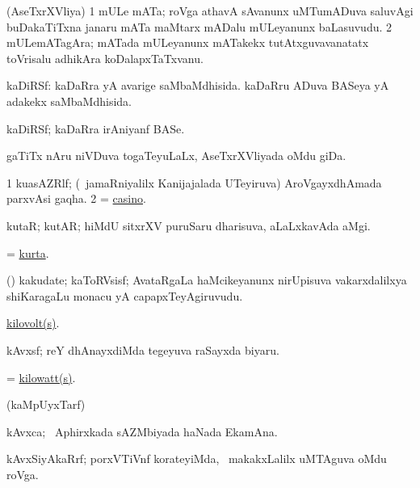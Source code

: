 \bentry
{}
\gl{\nA}
\bmng
(AseTxrXVliya) 
\bnum
\num{1} mULe mATa; roVga athavA sAvanunx uMTumADuva saluvAgi buDakaTiTxna janaru mATa maMtarx mADalu mULeyanunx baLasuvudu. 
\num{2} mULemATagAra; mATada mULeyanunx mATakekx tutAtxguvavanatatx toVrisalu adhikAra koDalapxTaTxvanu. 
\enum
\emng
\eentry

\bentry
{}
\gl{\gu}
\bmng
kaDiRSf: 
\banum
{} kaDaRra yA avarige saMbaMdhisida. 
 kaDaRru ADuva BASeya yA adakekx saMbaMdhisida. 
\eanum
\emng
\eentry

\bentry
{}
\gl{\nA}
\bmng
kaDiRSf; kaDaRra irAniyanf BASe. 
\emng
\eentry

\bentry
{}
\gl{\nA}
\bmng
gaTiTx nAru niVDuva togaTeyuLaLx, AseTxrXVliyada oMdu giDa. 
\emng
\eentry

\bentry
{}
\gl{\nA}
\bmng
\bnum
\num{1} kuasAZRlf; (\kanmu\ jamaRniyalilx Kanijajalada UTeyiruva) AroVgayxdhAmada parxvAsi gaqha. 
\num{2} = \hyperref{kandict_c.pdf}{C}{casino}{casino}. 
\enum
\emng
\eentry

\bentry
{}
\gl{\nA}
\bmng
kutaR; kutAR; hiMdU sitxrXV puruSaru dharisuva, aLaLxkavAda aMgi. 
\emng
\eentry

\bentry
{}
\gl{\nA}
\bmng
 = \hyperlink{kurta}{kurta}. 
\emng
\eentry

\bentry
{}
\gl{\nA}
\bmng
(\saMshA) kakudate; kaToRVsisf; AvataRgaLa haMcikeyanunx nirUpisuva vakarxdalilxya shiKaragaLu monacu yA capapxTeyAgiruvudu. 
\emng
\eentry

\bentry
{}
\gl{\saMkiSx}
\bmng
 \hyperlink{kilovolt}{kilovolt(s)}.
\emng
\eentry

\bentry
{}
\gl{\nA}
\bmng
kAvxsf; reY dhAnayxdiMda tegeyuva raSayxda biyaru. 
\emng
\eentry

\bentry
{}
\gl{\saMkiSx}
\bmng
 = \hyperlink{kilowatt}{kilowatt(s)}. 
\emng
\eentry

\bentry
{}
\gl{\saMkiSx}
\bmng
(kaMpUyxTarf)  
\emng
\eentry

\bentry
{}
\gl{\nA}
\bmng
kAvxca; \da\ Aphirxkada sAZMbiyada haNada EkamAna. 
\emng
\eentry

\bentry
{}
\gl{\nA}
\bmng
kAvxSiyAkaRrf; porxVTiVnf korateyiMda, \kanmu\ makakxLalilx uMTAguva oMdu roVga. 
\emng
\eentry

